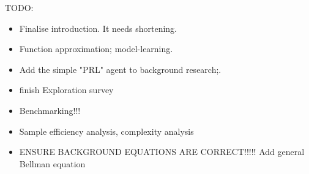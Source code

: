 TODO:
\begin{itemize}
    \item Finalise introduction. It needs shortening.
    \item Function approximation; model-learning.
    \item Add the simple "PRL" agent to background research;.
    \item finish Exploration survey
    \item Benchmarking!!!
    \item Sample efficiency analysis, complexity analysis
    \item ENSURE BACKGROUND EQUATIONS ARE CORRECT!!!!! Add general Bellman equation
\end{itemize}